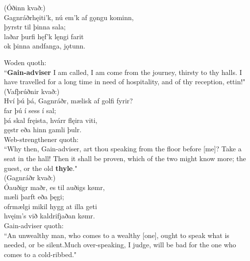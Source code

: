 (Óðinn kvað:) \\%
\bva Gagnráðr\footnotemark[5] hęiti'k, \hld nú em'k af gǫngu kominn, \\%
þyrstr til þinna sala; \\%
laðar þurfi \hld hęf'k lęngi farit \\%
ok þinna andfanga, jǫtunn.\\%

\bvb Woden quoth: \\ “\textbf{Gain-adviser} I am called, I am come from the journey, thirsty to thy halls. I have travelled for a long time in need of hospitality, and of thy reception, ettin!" \\

(Vafþrúðnir kvað:) \\%
\bva Hví þú þá, Gagnráðr, \hld mælisk af golfi fyrir? \\%
far þú í sess í sal; \\%
þá skal fręista, \hld hvárr flęira viti, \\%
gęstr eða hinn gamli þulr.\\%

\bvb Web-strengthener quoth: \\ “Why then, Gain-adviser, art thou speaking from the floor before [me]? Take a seat in the hall! Then it shall be proven, which of the two might know more; the guest, or the old \textbf{thyle}." \\

(Gagnráðr kvað:) \\%
\bva Óauðigr maðr, \hld es til auðigs kømr, \\%
mæli þarft eða þęgi; \\%
ofrmælgi mikil \hld hygg at illa geti \\%
hvęim's við kaldrifjaðan kømr.\\%

\bvb Gain-adviser quoth: \\ “An unwealthy man, who comes to a wealthy [one], ought to speak what is needed, or be silent.\footnotemark[14] Much over-speaking\footnotemark[15], I judge, will be bad for the one who comes to a cold-ribbed\footnotemark[16] [man]." \\

